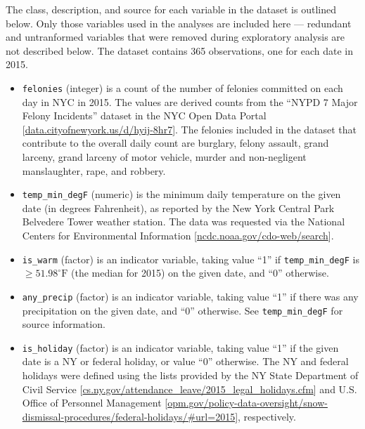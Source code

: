 \documentclass[11pt,notitlepage]{article}
\newcommand{\degf}{^\circ\text{F}}
\begin{document}
The class, description, and source for each variable in the dataset is outlined below. Only those variables used in the analyses are included here --- redundant and untranformed variables that were removed during exploratory analysis are not described below. The dataset contains 365 observations, one for each date in 2015.

\begin{itemize}
\setlength\itemsep{-1pt}

\item \texttt{felonies} (integer) is a count of the number of felonies committed on each day in NYC in 2015. The values are derived counts from the ``NYPD 7 Major Felony Incidents'' dataset in the NYC Open Data Portal [\href{https://data.cityofnewyork.us/Public-Safety/NYPD-7-Major-Felony-Incidents/hyij-8hr7}{data.cityofnewyork.us/d/hyij-8hr7}]. The felonies included in the dataset that contribute to the overall daily count are burglary, felony assault, grand larceny, grand larceny of motor vehicle, murder and non-negligent manslaughter, rape, and robbery.

\item \texttt{temp_min_degF} (numeric) is the minimum daily temperature on the given date (in degrees Fahrenheit), as reported by the New York Central Park Belvedere Tower weather station. The data was requested via the National Centers for Environmental Information [\href{http://www.ncdc.noaa.gov/cdo-web/search}{ncdc.noaa.gov/cdo-web/search}].

\item \texttt{is_warm} (factor) is an indicator variable, taking value ``1'' if \texttt{temp_min_degF} is $\geq 51.98 \degf$ (the median for 2015) on the given date, and ``0'' otherwise.

\item \texttt{any_precip} (factor) is an indicator variable, taking value ``1'' if there was any precipitation on the given date, and ``0'' otherwise. See \texttt{temp_min_degF} for source information.


\item \texttt{is_holiday} (factor) is an indicator variable, taking value ``1'' if the given date is a NY or federal holiday, or value ``0'' otherwise. The NY and federal holidays were defined using the lists provided by the NY State Department of Civil Service [\href{https://www.cs.ny.gov/attendance_leave/2015_legal_holidays.cfm}{cs.ny.gov/attendance_leave/2015_legal_holidays.cfm}] and U.S. Office of Personnel Management [\href{https://www.opm.gov/policy-data-oversight/snow-dismissal-procedures/federal-holidays/\#url=2015}{opm.gov/policy-data-oversight/snow-dismissal-procedures/federal-holidays/\#url=2015}], respectively.



\end{itemize}
\end{document}
